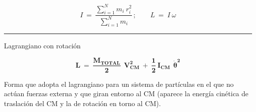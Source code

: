 $$\boldsymbol{}I\ = \ \dfrac{\displaystyle \sum_{i=1}^N m_i \ r_i^2}{\displaystyle \sum_{i=1}^N m_i}\, ; \qquad L \ = \ I \ \omega$$
\begin{flushright} \rule{300pt}{0.1pt}	\end{flushright}

\vspace{5mm}

\begin{myalertblock}{Lagrangiano con rotación}
\begin{large}
\begin{equation}
\label{T5Lconrotacion}
\boldsymbol{
L \ = \ \dfrac{M_{TOTAL}}{2}\ \ V_{CM}^2 \ + \ \dfrac 1 2 \ I_{CM}\  \ \dot \theta^2
} 
\end{equation}	
\end{large}
\end{myalertblock}

Forma que adopta el lagrangiano para un sistema de partículas en el que no actúan fuerzas externa y que giran entorno al CM (aparece la energía cinética de traslación del CM y la de rotación en torno al CM).

	

	
	
	
	
	







